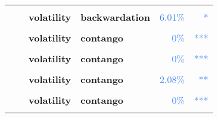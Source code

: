 \documentclass[
  authoryear,
  preprint,
  3p]{elsarticle}
\begin{document}
\begin{longtable}[t]{>{}l>{}l>{}l>{}l>{}r>{}r}
\addlinespace
\textbf{\cellcolor{gray!10}{Natural gas (XNYM)}} & \textbf{\cellcolor{gray!10}{past}} & \textbf{\cellcolor{gray!10}{mean}} & \textbf{\cellcolor{gray!10}{backwardation}} & \textcolor[HTML]{4285f4}{\cellcolor{gray!10}{4.66\%}} & \textcolor[HTML]{4285f4}{\cellcolor{gray!10}{**}}\\
\textbf{} & \textbf{} & \textbf{volatility} & \textbf{backwardation} & \textcolor[HTML]{4285f4}{6.01\%} & \textcolor[HTML]{4285f4}{*}\\
\textbf{\cellcolor{gray!10}{}} & \textbf{\cellcolor{gray!10}{financialisation}} & \textbf{\cellcolor{gray!10}{mean}} & \textbf{\cellcolor{gray!10}{contango}} & \textcolor[HTML]{4285f4}{\cellcolor{gray!10}{68.1\%}} & \textcolor[HTML]{4285f4}{\cellcolor{gray!10}{}}\\
\textbf{} & \textbf{} & \textbf{volatility} & \textbf{contango} & \textcolor[HTML]{4285f4}{0\%} & \textcolor[HTML]{4285f4}{\vphantom{24} ***}\\
\textbf{\cellcolor{gray!10}{}} & \textbf{\cellcolor{gray!10}{crisis}} & \textbf{\cellcolor{gray!10}{mean}} & \textbf{\cellcolor{gray!10}{contango}} & \textcolor[HTML]{4285f4}{\cellcolor{gray!10}{93.28\%}} & \textcolor[HTML]{4285f4}{\cellcolor{gray!10}{}}\\
\addlinespace
\textbf{} & \textbf{} & \textbf{volatility} & \textbf{contango} & \textcolor[HTML]{4285f4}{0\%} & \textcolor[HTML]{4285f4}{\vphantom{23} ***}\\
\textbf{\cellcolor{gray!10}{}} & \textbf{\cellcolor{gray!10}{post-crisis}} & \textbf{\cellcolor{gray!10}{mean}} & \textbf{\cellcolor{gray!10}{backwardation}} & \textcolor[HTML]{4285f4}{\cellcolor{gray!10}{67.04\%}} & \textcolor[HTML]{4285f4}{\cellcolor{gray!10}{}}\\
\textbf{} & \textbf{} & \textbf{volatility} & \textbf{contango} & \textcolor[HTML]{4285f4}{2.08\%} & \textcolor[HTML]{4285f4}{**}\\
\textbf{\cellcolor{gray!10}{Crude oil-WTI (XNYM)}} & \textbf{\cellcolor{gray!10}{past}} & \textbf{\cellcolor{gray!10}{mean}} & \textbf{\cellcolor{gray!10}{backwardation}} & \textcolor[HTML]{4285f4}{\cellcolor{gray!10}{38.33\%}} & \textcolor[HTML]{4285f4}{\cellcolor{gray!10}{}}\\
\textbf{} & \textbf{} & \textbf{volatility} & \textbf{contango} & \textcolor[HTML]{4285f4}{0\%} & \textcolor[HTML]{4285f4}{\vphantom{22} ***}\\
\addlinespace
\textbf{\cellcolor{gray!10}{}} & \textbf{\cellcolor{gray!10}{financialisation}} & \textbf{\cellcolor{gray!10}{mean}} & \textbf{\cellcolor{gray!10}{backwardation}} & \textcolor[HTML]{4285f4}{\cellcolor{gray!10}{61.91\%}} & \textcolor[HTML]{4285f4}{\cellcolor{gray!10}{}}\\

\end{longtable}
\end{document}
